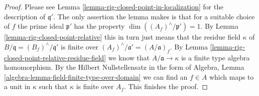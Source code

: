 \documentclass[10pt,a4paper]{amsart}
\theoremstyle{plain}
\theoremstyle{definition}
\theoremstyle{remark}
\numberwithin{equation}{subsection}
\begin{document}
\begin{proof}
Please see Lemma \ref{lemma-rig-closed-point-in-localization}
for the description of $\mathfrak q'$. The only assertion the lemma makes
is that for a suitable choice of $f$ the prime ideal $\mathfrak p'$
has the property $\dim((A_f)^\wedge/\mathfrak p') = 1$.
By Lemma \ref{lemma-rig-closed-point-relative} this in turn
just means that the residue field $\kappa$ of
$B/\mathfrak q = (B_f)^\wedge/\mathfrak q'$ is finite over
$(A_f)^\wedge/\mathfrak a' = (A/\mathfrak a)_f$.
By Lemma \ref{lemma-rig-closed-point-relative-residue-field}
we know that $A/\mathfrak a \to \kappa$ is a finite type
algebra homomorphism. By the Hilbert Nullstellensatz in
the form of Algebra, Lemma \ref{algebra-lemma-field-finite-type-over-domain}
we can find an $f \in A$ which maps to a unit in $\kappa$
such that $\kappa$ is finite over $A_f$. This finishes the proof.
\end{proof}
\end{document}
